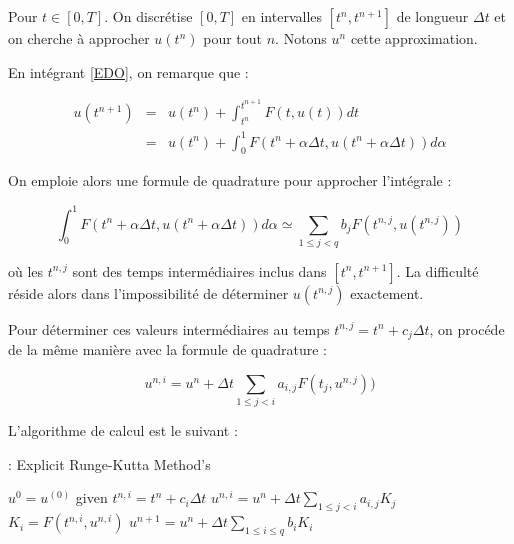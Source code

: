 \documentclass[10pt,a4paper]{amsart}
\def\gint{\displaystyle\int}
\begin{document}
Pour $t \in \left[ 0, T \right]$. On discrétise $\left[ 0, T \right]$ en intervalles $\left[ t^n, t^{n+1} \right]$ de longueur $\Delta t$ et on cherche à approcher $u(t^n)$ pour tout $n$. Notons $u^n$ cette approximation.

En intégrant \eqref{EDO}, on remarque que :

$$
\begin{array}{rcl}
u(t^{n+1}) & = & u(t^n) + \gint_{t^n}^{t^{n+1}} F(t, u(t))dt\\
           & = & u(t^n) + \gint_{0}^{1} F(t^n + \alpha \Delta t, u(t^n + \alpha \Delta t)) d \alpha
\end{array}
$$

On emploie alors une formule de quadrature pour approcher l'intégrale :

\begin{equation}\label{RK_quadratureglobale}
\gint_{0}^{1} F(t^n + \alpha \Delta t, u(t^n + \alpha \Delta t)) d \alpha \simeq \sum_{1 \leq j < q} b_j F(t^{n,j}, u(t^{n,j}))
\end{equation}

où les $t^{n,j}$ sont des temps intermédiaires inclus dans $\left[ t^n, t^{n+1} \right]$. La difficulté réside alors dans l'impossibilité de déterminer $u(t^{n,j})$ exactement.

Pour déterminer ces valeurs intermédiaires au temps $t^{n,j} = t^n + c_j \Delta t$, on procéde de la même manière avec la formule de quadrature :

\begin{equation}\label{RK_quadratureglobale}
u^{n,i} = u^n + \Delta t \sum_{1 \leq j < i} a_{i,j} F(t_j, u^{n,j}))
\end{equation}

L'algorithme de calcul est le suivant :

\begin{center}
\begin{minipage}[H]{12cm}
  \begin{algorithm}[H]
    \caption{: Explicit Runge-Kutta Method's}\label{RK}
    \begin{algorithmic}[1]
        \State $u^0 = u^{(0)}$ given
             \State  $t^{n,i} = t^n + c_i \Delta t$
             \State  $u^{n,i} = u^n + \Delta t \sum_{1 \leq j < i} a_{i,j} K_j$
             \State  $K_i = F(t^{n,i}, u^{n,i})$ 
             \EndFor
              \State $u^{n+1} = u^n + \Delta t \sum_{1 \leq i \leq q} b_i K_i$           
            \EndFor
    \end{algorithmic}
    \end{algorithm}
\end{minipage}
\end{center}
\end{document}
